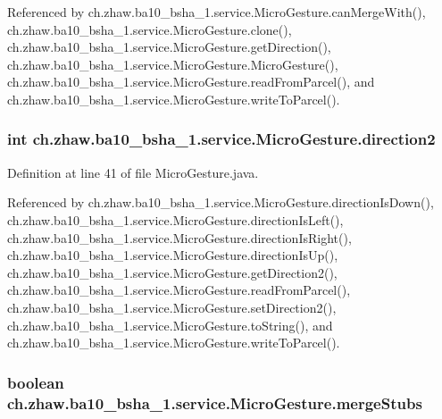 Referenced by ch.zhaw.ba10\_\-bsha\_\-1.service.MicroGesture.canMergeWith(), ch.zhaw.ba10\_\-bsha\_\-1.service.MicroGesture.clone(), ch.zhaw.ba10\_\-bsha\_\-1.service.MicroGesture.getDirection(), ch.zhaw.ba10\_\-bsha\_\-1.service.MicroGesture.MicroGesture(), ch.zhaw.ba10\_\-bsha\_\-1.service.MicroGesture.readFromParcel(), and ch.zhaw.ba10\_\-bsha\_\-1.service.MicroGesture.writeToParcel().\hypertarget{classch_1_1zhaw_1_1ba10__bsha__1_1_1service_1_1MicroGesture_a26b7878eab20cb414669e324e6baf64e}{
\subsubsection[{direction2}]{\setlength{\rightskip}{0pt plus 5cm}int {\bf ch.zhaw.ba10\_\-bsha\_\-1.service.MicroGesture.direction2}}}
\label{classch_1_1zhaw_1_1ba10__bsha__1_1_1service_1_1MicroGesture_a26b7878eab20cb414669e324e6baf64e}


Definition at line 41 of file MicroGesture.java.

Referenced by ch.zhaw.ba10\_\-bsha\_\-1.service.MicroGesture.directionIsDown(), ch.zhaw.ba10\_\-bsha\_\-1.service.MicroGesture.directionIsLeft(), ch.zhaw.ba10\_\-bsha\_\-1.service.MicroGesture.directionIsRight(), ch.zhaw.ba10\_\-bsha\_\-1.service.MicroGesture.directionIsUp(), ch.zhaw.ba10\_\-bsha\_\-1.service.MicroGesture.getDirection2(), ch.zhaw.ba10\_\-bsha\_\-1.service.MicroGesture.readFromParcel(), ch.zhaw.ba10\_\-bsha\_\-1.service.MicroGesture.setDirection2(), ch.zhaw.ba10\_\-bsha\_\-1.service.MicroGesture.toString(), and ch.zhaw.ba10\_\-bsha\_\-1.service.MicroGesture.writeToParcel().\hypertarget{classch_1_1zhaw_1_1ba10__bsha__1_1_1service_1_1MicroGesture_ad6fe6b70a61b144c8868ff32478d7d5a}{
\subsubsection[{mergeStubs}]{\setlength{\rightskip}{0pt plus 5cm}boolean {\bf ch.zhaw.ba10\_\-bsha\_\-1.service.MicroGesture.mergeStubs}}}
\label{classch_1_1zhaw_1_1ba10__bsha__1_1_1service_1_1MicroGesture_ad6fe6b70a61b144c8868ff32478d7d5a}


